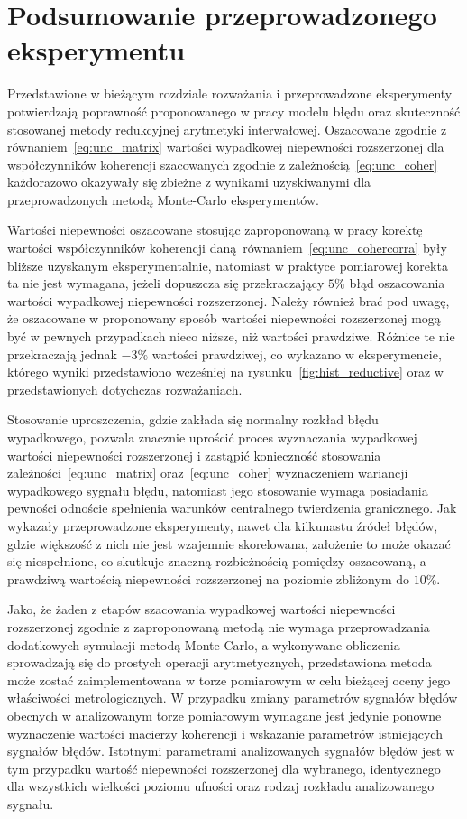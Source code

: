 \section{Podsumowanie przeprowadzonego eksperymentu}

Przedstawione w bieżącym rozdziale rozważania i przeprowadzone eksperymenty potwierdzają poprawność proponowanego w pracy modelu błędu oraz skuteczność stosowanej metody redukcyjnej arytmetyki interwałowej. Oszacowane zgodnie z równaniem~\eqref{eq:unc_matrix} wartości wypadkowej niepewności rozszerzonej dla współczynników koherencji szacowanych zgodnie z zależnością~\eqref{eq:unc_coher} każdorazowo okazywały się zbieżne z wynikami uzyskiwanymi dla przeprowadzonych metodą Monte-Carlo eksperymentów.

Wartości niepewności oszacowane stosując zaproponowaną w pracy korektę wartości współczynników koherencji daną równaniem~\eqref{eq:unc_cohercorra} były bliższe uzyskanym eksperymentalnie, natomiast w praktyce pomiarowej korekta ta nie jest wymagana, jeżeli dopuszcza się przekraczający $5\%$ błąd oszacowania wartości wypadkowej niepewności rozszerzonej. Należy również brać pod uwagę, że oszacowane w proponowany sposób wartości niepewności rozszerzonej mogą być w pewnych przypadkach nieco niższe, niż wartości prawdziwe. Różnice te nie przekraczają jednak $-3\%$ wartości prawdziwej, co wykazano w eksperymencie, którego wyniki przedstawiono wcześniej na rysunku~\ref{fig:hist_reductive} oraz w przedstawionych dotychczas rozważaniach.

Stosowanie uproszczenia, gdzie zakłada się normalny rozkład błędu wypadkowego, pozwala znacznie uprościć proces wyznaczania wypadkowej wartości niepewności rozszerzonej i zastąpić konieczność stosowania zależności~\eqref{eq:unc_matrix} oraz~\eqref{eq:unc_coher} wyznaczeniem wariancji wypadkowego sygnału błędu, natomiast jego stosowanie wymaga posiadania pewności odnoście spełnienia warunków centralnego twierdzenia granicznego. Jak wykazały przeprowadzone eksperymenty, nawet dla kilkunastu źródeł błędów, gdzie większość z nich nie jest wzajemnie skorelowana, założenie to może okazać się niespełnione, co skutkuje znaczną rozbieżnością pomiędzy oszacowaną, a prawdziwą wartością niepewności rozszerzonej na poziomie zbliżonym do $10\%$.

Jako, że żaden z etapów szacowania wypadkowej wartości niepewności rozszerzonej zgodnie z zaproponowaną metodą nie wymaga przeprowadzania dodatkowych symulacji metodą Monte-Carlo, a wykonywane obliczenia sprowadzają się do prostych operacji arytmetycznych, przedstawiona metoda może zostać zaimplementowana w torze pomiarowym w celu bieżącej oceny jego właściwości metrologicznych. W przypadku zmiany parametrów sygnałów błędów obecnych w analizowanym torze pomiarowym wymagane jest jedynie ponowne wyznaczenie wartości macierzy koherencji i wskazanie parametrów istniejących sygnałów błędów. Istotnymi parametrami analizowanych sygnałów błędów jest w tym przypadku wartość niepewności rozszerzonej dla wybranego, identycznego dla wszystkich wielkości poziomu ufności oraz rodzaj rozkładu analizowanego sygnału.


